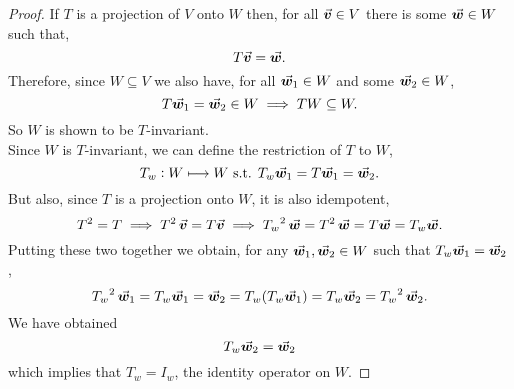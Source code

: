 \documentclass[../MathsNotesBase.tex]{subfiles}
\begin{document}
{	
	\biggerskip
		
	\begin{proof}
		If $T$ is a projection of $V$ onto $W$ then, for all ${ \vec{\bm{v}} \in V }$ there is some ${ \vec{\bm{w}} \in W }$ such that,
		\[ T\vec{\bm{v}} = \vec{\bm{w}}. \]
		Therefore, since ${ W \subseteq V }$ we also have, for all ${ \vec{\bm{w}}_1 \in W }$ and some ${ \vec{\bm{w}}_2 \in W }$,
		\[ T\vec{\bm{w}}_1 = \vec{\bm{w}}_2 \in W \implies TW \subseteq W. \]
		So $W$ is shown to be $T$-invariant.\\
		
		Since $W$ is $T$-invariant, we can define the restriction of $T$ to $W$,
		\[ T_w : W \longmapsto W \text{ s.t. } T_w\vec{\bm{w}}_1 = T\vec{\bm{w}}_1 = \vec{\bm{w}}_2. \]
		But also, since $T$ is a projection onto $W$, it is also idempotent,
		\[ T^2 = T \implies T^2\,\vec{\bm{v}} = T\vec{\bm{v}} \implies {T_w}^2\,\vec{\bm{w}} = T^2\,\vec{\bm{w}} = T\vec{\bm{w}} = T_w\vec{\bm{w}}. \]
		Putting these two together we obtain, for any ${ \vec{\bm{w}}_1,\vec{\bm{w}}_2 \in W }$ such that ${ T_w\vec{\bm{w}}_1 = \vec{\bm{w}}_2 }$,
		\[ {T_w}^2\,\vec{\bm{w}}_1 = T_w\vec{\bm{w}}_1 = \vec{\bm{w}}_2 = T_w(T_w\vec{\bm{w}}_1) = T_w\vec{\bm{w}}_2 = {T_w}^2\,\vec{\bm{w}}_2. \]
		We have obtained 
		\[ T_w\vec{\bm{w}}_2 = \vec{\bm{w}}_2 \]
		which implies that ${ T_w = I_w }$, the identity operator on $W$.
	\end{proof}
}
\end{document}

